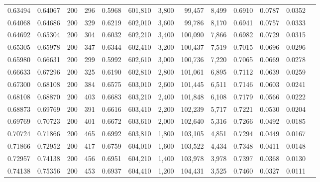 \begin{tabular}{rrrrrrrrrrrrr}
0.63494 & 0.64067 &    200 & 296 &                                     0.5968 & 601,810 &   3,800 &  99,457 &   8,499 & 0.6910 & 0.0787 & 0.0352 \\
0.64068 & 0.64686 &    200 & 329 &                                     0.6219 & 602,010 &   3,600 &  99,786 &   8,170 & 0.6941 & 0.0757 & 0.0333 \\
0.64692 & 0.65304 &    200 & 304 &                                     0.6032 & 602,210 &   3,400 & 100,090 &   7,866 & 0.6982 & 0.0729 & 0.0315 \\
0.65305 & 0.65978 &    200 & 347 &                                     0.6344 & 602,410 &   3,200 & 100,437 &   7,519 & 0.7015 & 0.0696 & 0.0296 \\
0.65980 & 0.66631 &    200 & 299 &                                     0.5992 & 602,610 &   3,000 & 100,736 &   7,220 & 0.7065 & 0.0669 & 0.0278 \\
0.66633 & 0.67296 &    200 & 325 &                                     0.6190 & 602,810 &   2,800 & 101,061 &   6,895 & 0.7112 & 0.0639 & 0.0259 \\
0.67300 & 0.68108 &    200 & 384 &                                     0.6575 & 603,010 &   2,600 & 101,445 &   6,511 & 0.7146 & 0.0603 & 0.0241 \\
0.68108 & 0.68870 &    200 & 403 &                                     0.6683 & 603,210 &   2,400 & 101,848 &   6,108 & 0.7179 & 0.0566 & 0.0222 \\
0.68873 & 0.69769 &    200 & 391 &                                     0.6616 & 603,410 &   2,200 & 102,239 &   5,717 & 0.7221 & 0.0530 & 0.0204 \\
0.69769 & 0.70723 &    200 & 401 &                                     0.6672 & 603,610 &   2,000 & 102,640 &   5,316 & 0.7266 & 0.0492 & 0.0185 \\
0.70724 & 0.71866 &    200 & 465 &                                     0.6992 & 603,810 &   1,800 & 103,105 &   4,851 & 0.7294 & 0.0449 & 0.0167 \\
0.71866 & 0.72952 &    200 & 417 &                                     0.6759 & 604,010 &   1,600 & 103,522 &   4,434 & 0.7348 & 0.0411 & 0.0148 \\
0.72957 & 0.74138 &    200 & 456 &                                     0.6951 & 604,210 &   1,400 & 103,978 &   3,978 & 0.7397 & 0.0368 & 0.0130 \\
0.74138 & 0.75356 &    200 & 453 &                                     0.6937 & 604,410 &   1,200 & 104,431 &   3,525 & 0.7460 & 0.0327 & 0.0111 \\

\end{tabular}
